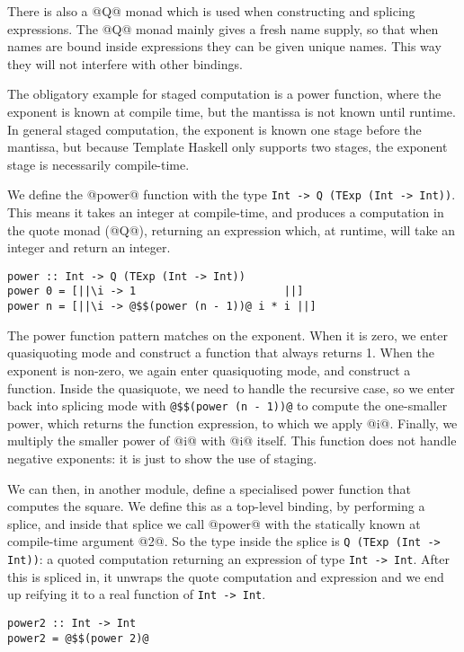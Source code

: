 There is also a @Q@ monad which is used when constructing and splicing expressions.
The @Q@ monad mainly gives a fresh name supply, so that when names are bound inside expressions they can be given unique names. This way they will not interfere with other bindings.

The obligatory example for staged computation is a power function, where the exponent is known at compile time, but the mantissa is not known until runtime.
In general staged computation, the exponent is known one stage before the mantissa, but because Template Haskell only supports two stages, the exponent stage is necessarily compile-time.

We define the @power@ function with the type \lstinline/Int -> Q (TExp (Int -> Int))/. This means it takes an integer at compile-time, and produces a computation in the quote monad (@Q@), returning an expression which, at runtime, will take an integer and return an integer.

\begin{lstlisting}
power :: Int -> Q (TExp (Int -> Int))
power 0 = [||\i -> 1                       ||]
power n = [||\i -> @$$(power (n - 1))@ i * i ||]
\end{lstlisting}

The power function pattern matches on the exponent.
When it is zero, we enter quasiquoting mode and construct a function that always returns 1.
When the exponent is non-zero, we again enter quasiquoting mode, and construct a function.
Inside the quasiquote, we need to handle the recursive case, so we enter back into splicing mode with \lstinline/@$$(power (n - 1))@/ to compute the one-smaller power, which returns the function expression, to which we apply @i@. Finally, we multiply the smaller power of @i@ with @i@ itself.
This function does not handle negative exponents: it is just to show the use of staging.

We can then, in another module, define a specialised power function that computes the square.
We define this as a top-level binding, by performing a splice, and inside that splice we call @power@ with the statically known at compile-time argument @2@.
So the type inside the splice is \lstinline/Q (TExp (Int -> Int))/: a quoted computation returning an expression of type \lstinline/Int -> Int/.
After this is spliced in, it unwraps the quote computation and expression and we end up reifying it to a real function of \lstinline/Int -> Int/.

\begin{lstlisting}
power2 :: Int -> Int
power2 = @$$(power 2)@
\end{lstlisting}


